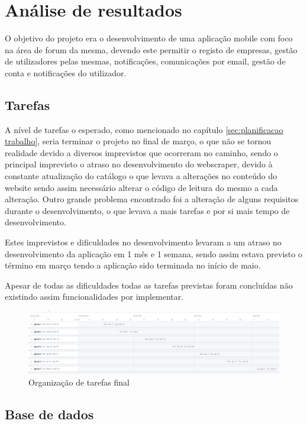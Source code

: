 \chapter{Análise de resultados}
 O objetivo do projeto era o desenvolvimento de uma aplicação mobile com foco na área de forum da mesma, devendo este permitir o registo de empresas, gestão de utilizadores pelas mesmas, notificações, comunicações por email, gestão de conta e notificações do utilizador.

 \section{Tarefas}

A nível de tarefas o esperado, como mencionado no capítulo \ref{sec:planificacao trabalho}, seria terminar o projeto no final de março, o que não se tornou realidade devido a diversos imprevistos que ocorreram no caminho, sendo o principal imprevisto o atraso no desenvolvimento do webscraper, devido à constante atualização do catálogo o que levava a alterações no conteúdo do website sendo assim necessário alterar o código de leitura do mesmo a cada alteração. Outro grande problema encontrado foi a alteração de alguns requisitos durante o desenvolvimento, o que levava a mais tarefas e por si mais tempo de desenvolvimento.

Estes imprevistos e dificuldades no desenvolvimento levaram a um atraso no desenvolvimento da aplicação em 1 mês e 1 semana, sendo assim estava previsto o término em março tendo a aplicação sido terminada no início de maio.

Apesar de todas as dificuldades todas as tarefas previstas foram concluídas não existindo assim funcionalidades por implementar.

\begin{figure}[htb]
  \centering
  \includegraphics[width=\textwidth]{images/analise_resultados/planeamento_final.png}
  \caption{Organização de tarefas final}
  \label{fig:78}
\end{figure}

\newpage

\section{Base de dados}

